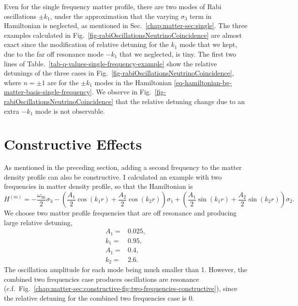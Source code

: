 Even for the single frequency matter profile, there are two modes of Rabi oscillations $\pm k_1$, under the approximation that the varying $\sigma_3$ term in Hamiltonian is neglected, as mentioned in Sec.~\ref{chap:matter-sec:single}. The three examples calculated in Fig.~\ref{fig-rabiOscillationsNeutrinoCoincidence} are almost exact since the modification of relative detuning for the $k_1$ mode that we kept, due to the far off resonance mode $-k_1$ that we neglected, is tiny. The first two lines of Table.~\ref{tab-q-values-single-frequency-example} show the relative detunings of the three cases in Fig.~\ref{fig-rabiOscillationsNeutrinoCoincidence}, where $n=\pm 1$ are for the $\pm k_1$ modes in the Hamiltonian \ref{eq-hamiltonian-bg-matter-basis-single-frequency}. We observe in Fig.~\ref{fig-rabiOscillationsNeutrinoCoincidence} that the relative detuning change due to an extra $-k_1$ mode is not observable.


\section{\label{chap:matter-sec:constructive}Constructive Effects}

As mentioned in the preceding section, adding a second frequency to the matter density profile can also be constructive. I calculated an example with two frequencies in matter density profile, so that the Hamiltonian is
\begin{equation*}
    H^{(m)} = - \frac{\omega_{\mathrm m}}{2} \sigma_3 - \left(\frac{A_1}{2}\cos(k_1 r) + \frac{A_2}{2}\cos(k_2 r) \right) \sigma_1 + \left( \frac{A_1}{2}\sin(k_1 r) + \frac{A_2}{2}\sin(k_2 r) \right) \sigma_2.
\end{equation*}
We choose two matter profile frequencies that are off resonance and producing large relative detuning,
\begin{align}
    A_1 =& 0.025, \\
    k_1 =& 0.95, \\
    A_1 =& 0.4, \\
    k_2 =& 2.6.
\end{align}
The oscillation amplitude for each mode being much smaller than 1. However, the combined two frequencies case produces oscillations are resonance (c.f.~Fig.~\ref{chap:matter-sec:constructive-fig:two-frequencies-constructive}), since the relative detuning for the combined two frequencies case is 0.

